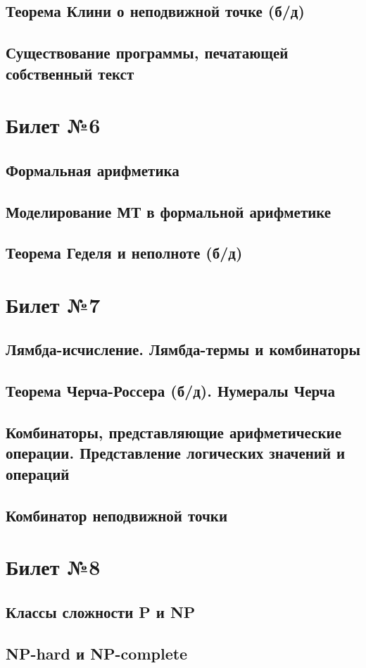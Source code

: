 \documentclass[a4paper]{article}
\theoremstyle{plain}
\theoremstyle{remark}
\theoremstyle{definition}
\begin{document}
\subsection{Теорема Клини о неподвижной точке (б/д)}
\subsection{Существование программы, печатающей собственный текст}

\section{Билет №6}
\subsection{Формальная арифметика}
\subsection{Моделирование МТ в формальной арифметике}
\subsection{Теорема Геделя и неполноте (б/д)}

\section{Билет №7}
\subsection{Лямбда-исчисление. Лямбда-термы и комбинаторы}
\subsection{Теорема Черча-Россера (б/д). Нумералы Черча}
\subsection{Комбинаторы, представляющие арифметические операции. Представление логических значений и операций}
\subsection{Комбинатор неподвижной точки}

\section{Билет №8}
\subsection{Классы сложности P и NP}
\subsection{NP-hard и NP-complete}
\end{document}
